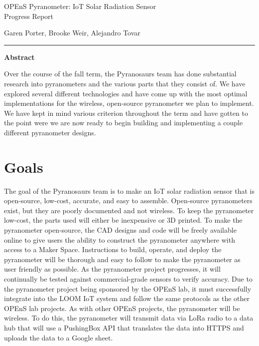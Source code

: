 \documentclass[10pt,draftclsnofoot,onecolumn,letterpaper]{article}
\begin{document}
\begin{Center}
{\fontsize{14pt}{16.8pt}\selectfont OPEnS Pyranometer: IoT Solar Radiation Sensor\\ Progress Report\par}
\end{Center}\par
    
\begin{Center}
Garen Porter, Brooke Weir, Alejandro Tovar\\
\end{Center}\par
\hrule
\begin{Center}
{\fontsize{12pt}{16.8pt}\selectfont \textbf{Abstract}\par}
\end{Center}\par
    
{\fontsize{10pt}{12.0pt}\selectfont Over the course of the fall term, the Pyranosaurs team has done substantial research into pyranometers and the various parts that they consist of. We have explored several different technologies and have come up with the most optimal implementations for the wireless, open-source pyranometer we plan to implement. We have kept in mind various criterion throughout the term and have gotten to the point were we are now ready to begin building and implementing a couple different pyranometer designs.
\par}\par
\newpage
{}
\tableofcontents
\clearpage
    
\section{Goals}
    The goal of the Pyranosaurs team is to make an IoT solar radiation sensor that is open-source, low-cost, accurate, and easy to assemble. Open-source pyranometers exist, but they are poorly documented and not wireless. To keep the pyranometer low-cost, the parts used will either be inexpensive or 3D printed. To make the pyranometer open-source, the CAD designs and code will be freely available online to give users the ability to construct the pyranometer anywhere with access to a Maker Space. Instructions to build, operate, and deploy the pyranometer will be thorough and easy to follow to make the pyranometer as user friendly as possible. As the pyranometer project progresses, it will continually be tested against commercial-grade sensors to verify accuracy. Due to the pyranometer project being sponsored by the OPEnS lab, it must successfully integrate into the LOOM IoT system and follow the same protocols as the other OPEnS lab projects. As with other OPEnS projects, the pyranometer will be wireless. To do this, the pyranometer will transmit data via LoRa radio to a data hub that will use a PushingBox API that translates the data into HTTPS and uploads the data to a Google sheet.
    
\end{document}
